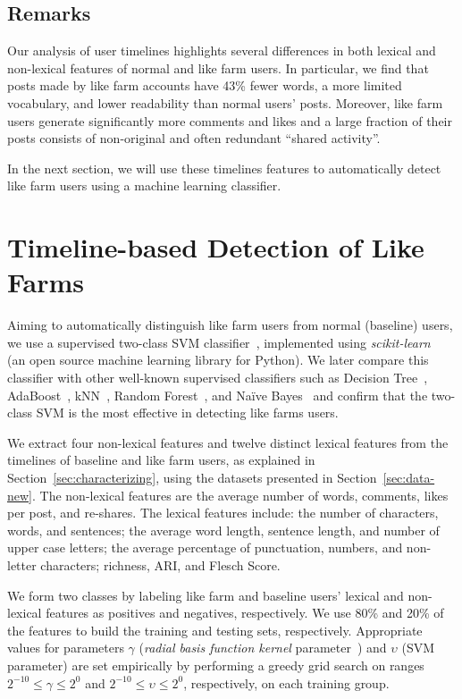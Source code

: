 \documentclass[twocolumn,10pt,letterpaper]{article}
\begin{document}
\subsection{Remarks}
Our analysis of user timelines highlights several differences in both lexical and non-lexical features of normal and like farm users. In particular, we find that posts made by like farm accounts have 43\% fewer words, a more limited vocabulary, and lower readability than normal users' posts. Moreover, %
like farm users generate significantly more comments and likes and a large fraction of their posts consists of non-original and often redundant ``shared activity''. 
%
%

In the next section, we will use these timelines features to automatically detect like farm users using a machine learning classifier.

\section{Timeline-based Detection of Like Farms}
\label{sec:detection}
Aiming to automatically distinguish like farm users from normal (baseline) users, we use a supervised two-class SVM classifier~\cite{Muller01anintroduction}, implemented using \emph{scikit-learn}~\cite{sklearn_api} (an open source machine learning library for Python). We later compare this classifier with other well-known supervised classifiers such as Decision Tree~\cite{dtree}, AdaBoost~\cite{adaboost}, kNN~\cite{knn}, Random Forest~\cite{Breiman:rf}, and Na\"ive Bayes~\cite{zhang2004optimality} and confirm that the two-class SVM is the most effective in detecting like farms users.


We extract four non-lexical features and twelve distinct lexical features from the timelines of baseline and like farm users, as explained in Section~\ref{sec:characterizing}, using the datasets presented in Section~\ref{sec:data-new}. The non-lexical features are the average number of words, comments, likes per post, and re-shares. The lexical features include: the number of characters, words, and sentences; the average word length, sentence length, and number of upper case letters; the average percentage of punctuation, numbers, and non-letter characters; richness, ARI, and Flesch Score.


We form two classes by labeling like farm and baseline users' lexical and non-lexical features as positives and negatives, respectively. We use 80\% and 20\% of the features to build the training and testing sets, respectively. Appropriate values for parameters $\gamma$ (\emph{radial basis function kernel} parameter~\cite{Scholkopf:2001:ESH:1119748.1119749}) and $\upsilon$ (SVM parameter) are set empirically by performing a greedy grid search on ranges $2^{-10} \leq \gamma \leq 2^{0}$ and $2^{-10} \leq \upsilon \leq 2^{0}$, respectively, on each training group.
\end{document}
